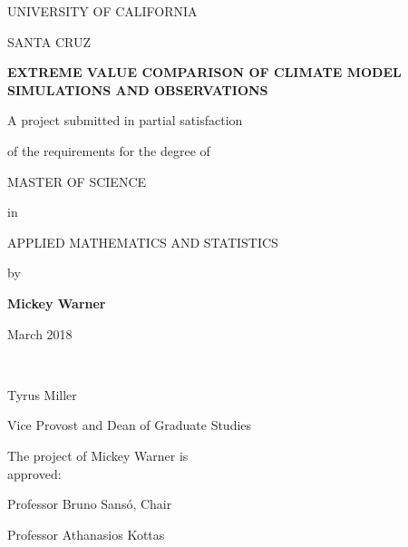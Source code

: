\thispagestyle{empty} %

\singlespacing

\begin{center}
UNIVERSITY OF CALIFORNIA
\bigskip

SANTA CRUZ
\bigskip
\bigskip
\bigskip

\textbf{EXTREME VALUE COMPARISON OF CLIMATE MODEL SIMULATIONS AND OBSERVATIONS}
\bigskip
\bigskip
\bigskip

A project submitted in partial satisfaction

of the requirements for the degree of
\bigskip
\bigskip

MASTER OF SCIENCE
\bigskip

in
\bigskip

APPLIED MATHEMATICS AND STATISTICS
\bigskip
\bigskip

by
\bigskip
\bigskip

\textbf{Mickey Warner}
\bigskip

March 2018
\bigskip
\bigskip

\end{center}


\begin{multicols*}{2}

\ 

\bigskip
\bigskip
\bigskip
\bigskip
\bigskip
\bigskip
\bigskip
\bigskip
\bigskip
\bigskip
\bigskip
\bigskip
\bigskip
\bigskip
\bigskip
\bigskip
\bigskip


\hline
\bigskip
\noindent Tyrus Miller

\noindent Vice Provost and Dean of Graduate Studies



\noindent The project of Mickey Warner is\\approved:
\bigskip
\bigskip
\bigskip
\bigskip

\hline
\bigskip
\noindent Professor Bruno Sans{\'o}, Chair
\bigskip
\bigskip
\bigskip
\bigskip

\hline
\bigskip
\noindent Professor Athanasios Kottas


\end{multicols*}




\doublespacing

\newpage
